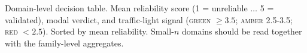 \begin{table}[tbp]\centering\small
\caption{Domain-level decision table. Mean reliability score (1 = unreliable $\dots$ 5 = validated), modal verdict,
and traffic-light signal (\textsc{green} $\ge 3.5$; \textsc{amber} 2.5-3.5; \textsc{red} $<2.5$). Sorted by mean
reliability. Small-$n$ domains should be read together with the family-level aggregates.}
\label{tab:decision}

\end{table}